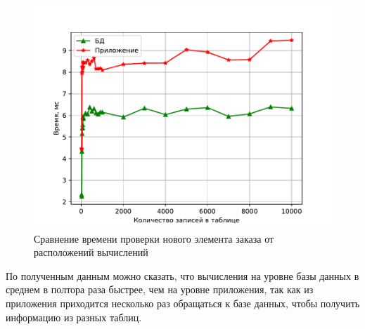 \begin{figure}[H]
\vspace{-40pt}
	\centering
	\includegraphics[scale=1]{inc/img/resultGraph.pdf}
	\caption{Сравнение времени проверки нового элемента заказа от расположений вычислений}
	\label{img:res}
\end{figure} 




По полученным данным можно сказать, что вычисления на уровне базы данных в среднем в полтора раза быстрее, чем на уровне приложения, так как из приложения приходится несколько раз обращаться к базе данных, чтобы получить информацию из разных таблиц.